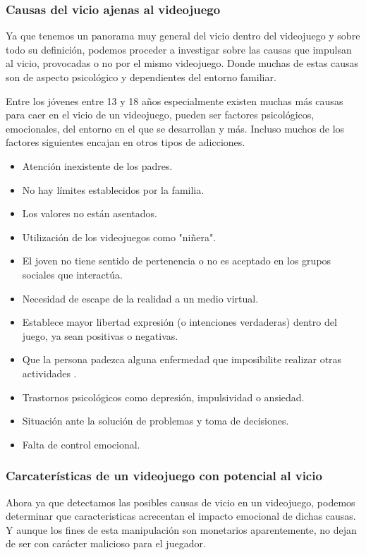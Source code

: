 \subsubsection{Causas del vicio ajenas al videojuego }
Ya que tenemos un panorama muy general del vicio dentro del videojuego y sobre todo su definición, podemos proceder a investigar sobre las causas que impulsan al vicio, provocadas o no por el mismo videojuego. Donde muchas de estas causas son de aspecto psicológico y dependientes del entorno familiar.

Entre los jóvenes entre 13 y 18 años especialmente existen muchas más causas para caer en el vicio de un videojuego, pueden ser factores psicológicos, emocionales, del entorno en el que se desarrollan y más. Incluso muchos de los factores siguientes encajan en otros tipos de adicciones.
\begin{itemize}
	\item Atención inexistente de los padres.
	\item No hay límites establecidos por la familia.
	\item Los valores no están asentados.
	\item Utilización de los videojuegos como "niñera".
	\item El joven no tiene sentido de pertenencia o no es aceptado en los grupos sociales que interactúa.
	\item Necesidad de escape de la realidad a un medio virtual.
	\item Establece mayor libertad expresión (o intenciones verdaderas) dentro del juego, ya sean positivas o negativas.
	\item Que la persona padezca alguna enfermedad que imposibilite realizar otras actividades .
	\item Trastornos psicológicos como depresión, impulsividad o ansiedad.
	\item Situación ante la solución de problemas y toma de decisiones.
	\item Falta de control emocional.
\end{itemize}

\subsubsection{Carcaterísticas de un videojuego con potencial al vicio}
Ahora ya que detectamos las posibles causas de vicio en un videojuego, podemos determinar que caracteristicas acrecentan el impacto emocional de dichas causas. Y aunque los fines de esta manipulación son monetarios aparentemente, no dejan de ser con carácter malicioso para el juegador.

